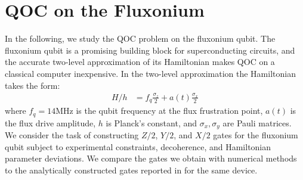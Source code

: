 \section{QOC on the Fluxonium \label{sec:fluxonium}}
In the following, we study
the QOC problem on the fluxonium qubit.
The fluxonium qubit is a promising building block for superconducting
circuits, and the accurate
two-level approximation of its Hamiltonian makes
QOC on a classical computer inexpensive.
In the two-level
approximation the Hamiltonian takes the form:
\begin{align}
  H/h &= f_{q} \frac{\sigma_{z}}{2} + a(t) \frac{\sigma_{x}}{2}
  \label{eq:hamiltonian}
\end{align}
where $f_{q} = 14$MHz is the qubit frequency at the flux frustration point,
$a(t)$ is the flux drive amplitude, $h$ is Planck's constant, and $\sigma_{x}, \sigma_{y}$
are Pauli matrices. We consider the task of constructing $Z/2$, $Y/2$, and $X/2$
gates for the fluxonium qubit subject to experimental constraints, decoherence, and
Hamiltonian parameter deviations. We compare the gates we obtain with numerical
methods to the analytically constructed gates reported in
\cite{zhang2020universal} for the same device.

